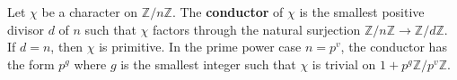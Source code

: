 Let $\chi$ be a character on $\mathbb{Z}/n\mathbb{Z}$. The \textbf{conductor} of $\chi$ is the smallest positive divisor $d$ of $n$ such that $\chi$ factors through the natural surjection $\mathbb{Z}/n\mathbb{Z} \to \mathbb{Z}/d\mathbb{Z}$. If $d = n$, then $\chi$ is primitive. In the prime power case $n = p^v$, the conductor has the form $p^g$ where $g$ is the smallest integer such that $\chi$ is trivial on $1 + p^g \mathbb{Z}/p^v\mathbb{Z}$.
